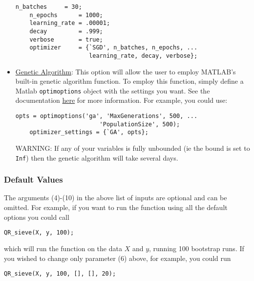 \documentclass[12pt]{article}
\begin{document}
\begin{itemize}
    \lstset{language=matlab}
    \begin{lstlisting}[backgroundcolor = \color{codeyellow}]
    n_batches     = 30;
    n_epochs      = 1000;
    learning_rate = .00001;
    decay         = .999;
    verbose       = true;
    optimizer     = {`SGD', n_batches, n_epochs, ...
                     learning_rate, decay, verbose};
    \end{lstlisting}

    \item \underline{Genetic Algorithm}: This option will allow the user to employ MATLAB's built-in genetic algorithm function. To employ this function, simply define a Matlab \lstinline{optimoptions} object with the settings you want. See the documentation \href{https://www.mathworks.com/help/gads/ga.html}{here} for more information. For example, you could use:

    \begin{lstlisting}[backgroundcolor = \color{codeyellow}]
    opts = optimoptions('ga', 'MaxGenerations', 500, ...
                        'PopulationSize', 500);
    optimizer_settings = {`GA', opts};
    \end{lstlisting}

    WARNING: If any of your variables is fully unbounded (ie the bound is set to \lstinline{Inf}) then the genetic algorithm will take several days.

\end{itemize}

\subsubsection{Default Values}

The arguments (4)-(10) in the above list of inputs are optional and can be omitted. For example, if you want to run the function using all the default options you could call

\begin{lstlisting}[backgroundcolor = \color{codeyellow}]
QR_sieve(X, y, 100);
\end{lstlisting}

which will run the function on the data $X$ and $y$, running 100 bootstrap runs. If you wished to change only parameter (6) above, for example, you could run

\begin{lstlisting}[backgroundcolor = \color{codeyellow}]
QR_sieve(X, y, 100, [], [], 20);
\end{lstlisting}
\end{document}
